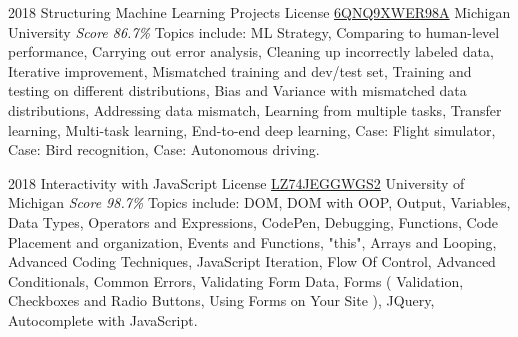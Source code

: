 \documentclass[11pt,a4paper]{moderncv}
\begin{document}
\cventry
    {2018}
    {Structuring Machine Learning Projects}
    {License
        \href{https://www.coursera.org/account/accomplishments/records/6QNQ9XWER98A}
        {6QNQ9XWER98A}
    }
    {Michigan University}
    {\textit{Score 86.7\%}}
    {
        Topics include:
            ML Strategy,
            Comparing to human-level performance,
            Carrying out error analysis,
            Cleaning up incorrectly labeled data,
            Iterative improvement,
            Mismatched training and dev/test set,
            Training and testing on different distributions,
            Bias and Variance with mismatched data distributions,
            Addressing data mismatch,
            Learning from multiple tasks,
            Transfer learning,
            Multi-task learning,
            End-to-end deep learning,
            Case: Flight simulator,
            Case: Bird recognition,
            Case: Autonomous driving.
    }

\cventry
    {2018}
    {Interactivity with JavaScript}
    {License
        \href{https://www.coursera.org/account/accomplishments/records/LZ74JEGGWGS2}
        {LZ74JEGGWGS2}
    }
    {University of Michigan}
    {\textit{Score 98.7\%}}
    {
        Topics include:
            DOM,
            DOM with OOP,
            Output,
            Variables,
            Data Types,
            Operators and Expressions,
            CodePen,
            Debugging,
            Functions,
            Code Placement and organization,
            Events and Functions,
            "this",
            Arrays and Looping,
            Advanced Coding Techniques,
            JavaScript Iteration,
            Flow Of Control,
            Advanced Conditionals,
            Common Errors,
            Validating Form Data,
            Forms (
                Validation,
                Checkboxes and Radio Buttons,
                Using Forms on Your Site
                ),
            JQuery,
            Autocomplete with JavaScript.
    }
\end{document}
